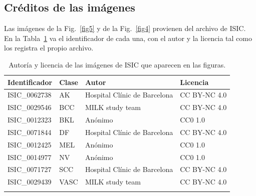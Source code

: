 \documentclass[pdflatex,sn-mathphys-num]{sn-jnl}%
\theoremstyle{thmstyleone}%
\theoremstyle{thmstyletwo}%
\theoremstyle{thmstylethree}%
\begin{document}
\begin{appendices}

\section{Créditos de las imágenes}\label{secA1}

Las imágenes de la Fig.~\ref{fig5} y de la Fig.~\ref{fig4} provienen del archivo de ISIC. En la Tabla~\ref{tabA1} va el identificador de cada una, con el autor y la licencia tal como los registra el propio archivo.

\begin{table}[h]
\caption{Autoría y licencia de las imágenes de ISIC que aparecen en las figuras.}\label{tabA1}%
\begin{tabular}{@{}llll@{}}
\toprule
Identificador & Clase & Autor & Licencia \\
\midrule
ISIC\_0062738 & AK   & Hospital Clínic de Barcelona & CC BY-NC 4.0 \\
ISIC\_0029546 & BCC  & MILK study team              & CC BY-NC 4.0 \\
ISIC\_0012323 & BKL  & Anónimo                      & CC0 1.0 \\
ISIC\_0071844 & DF   & Hospital Clínic de Barcelona & CC BY-NC 4.0 \\
ISIC\_0012425 & MEL  & Anónimo                      & CC0 1.0 \\
ISIC\_0014977 & NV   & Anónimo                      & CC0 1.0 \\
ISIC\_0071727 & SCC  & Hospital Clínic de Barcelona & CC BY-NC 4.0 \\
ISIC\_0029439 & VASC & MILK study team              & CC BY-NC 4.0 \\
\botrule
\end{tabular}
\end{table}

\end{appendices}


\end{document}

